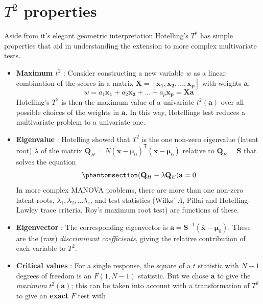 \documentclass[
  letterpaper,
  10pt,
  krantz2]{krantz}
\begin{document}
\section{\texorpdfstring{\(T^2\)
properties}{T\^{}2 properties}}\label{t2-properties}

Aside from it's elegant geometric interpretation Hotelling's \(T^2\) has
simple properties that aid in understanding the extension to more
complex multivariate tests.

\begin{itemize}
\item
  \textbf{Maximum \(t^2\)} : Consider constructing a new variable \(w\)
  as a linear combination of the scores in a matrix
  \(\mathbf{X} = [ \mathbf{x_1}, \mathbf{x_2}, \dots, \mathbf{x_p}]\)
  with weights \(\mathbf{a}\), \[
  w = a_1 \mathbf{x_1} + a_2 \mathbf{x_2} + \dots + a_p \mathbf{x_p} = \mathbf{X} \mathbf{a}
  \] Hotelling's \(T^2\) is then the maximum value of a univariate
  \(t^2 (\mathbf{a})\) over all possible choices of the weights in
  \(\mathbf{a}\). In this way, Hotellings test reduces a multivariate
  problem to a univariate one.
\item
  \textbf{Eigenvalue} : Hotelling showed that \(T^2\) is the one
  non-zero eigenvalue (latent root) \(\lambda\) of the matrix
  \(\mathbf{Q}_H = N (\bar{\mathbf{x}} - \mathbf{\mu}_0)^\mathsf{T}  (\bar{\mathbf{x}} - \mathbf{\mu}_0)\)
  relative to \(\mathbf{Q}_E = \mathbf{S}\) that solves the equation
  \begin{equation}\phantomsection\label{eq-eigen}{
  (\mathbf{Q}_H - \lambda \mathbf{Q}_E) \mathbf{a} = 0
  }\end{equation} In more complex MANOVA problems, there are more than
  one non-zero latent roots, \(\lambda_1, \lambda_2, \dots \lambda_s\),
  and test statistics (Wilks' \(\Lambda\), Pillai and Hotelling-Lawley
  trace criteria, Roy's maximum root test) are functions of these.
\item
  \textbf{Eigenvector} : The corresponding eigenvector is
  \(\mathbf{a} = \mathbf{S}^{-1} (\bar{\mathbf{x}} - \mathbf{\mu}_0)\).
  These are the (raw) \emph{discriminant coefficients}, giving the
  relative contribution of each variable to \(T^2\).
\item
  \textbf{Critical values} : For a single response, the square of a
  \(t\) statistic with \(N-1\) degrees of freedom is an \(F (1, N-1)\)
  statistic. But we chose \(\mathbf{a}\) to give the \emph{maximum}
  \(t^2 (\mathbf{a})\); this can be taken into account with a
  transformation of \(T^2\) to give an \textbf{exact} \(F\) test with

\end{itemize}
\end{document}
